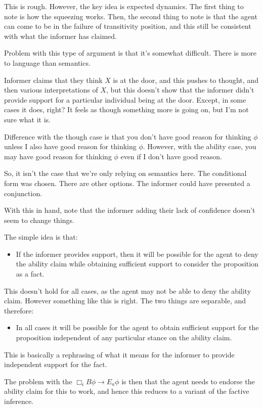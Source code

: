 \documentclass[10pt]{article}
\newcommand{\hozlinedash}[0]{%
  \noindent\hdashrule[0.5ex][c]{\textwidth}{.1pt}{2.5pt}
}
\begin{document}
\begin{note}
This is rough.
However, the key idea is expected dynamics.
The first thing to note is how the squeezing works.
Then, the second thing to note is that the agent can come to be in the failure of transitivity position, and this still be consistent with what the informer has claimed.

Problem with this type of argument is that it's somewhat difficult.
There is more to language than semantics.

Informer claims that they think \(X\) is at the door, and this pushes to thought, and then various interpretations of \(X\), but this doesn't show that the informer didn't provide support for a particular individual being at the door.
Except, in some cases it does, right?
It feels as though something more is going on, but I'm not sure what it is.

Difference with the though case is that you don't have good reason for thinking \(\phi\) unless I also have good reason for thinking \(\phi\).
However, with the ability case, you may have good reason for thinking \(\phi\) even if I don't have good reason.

So, it isn't the case that we're only relying on semantics here.
The conditional form was chosen.
There are other options.
The informer could have presented a conjunction.

With this in hand, note that the informer adding their lack of confidence doesn't seem to change things.
\end{note}





\hozlinedash

\begin{note}
  The simple idea is that:
  \begin{itemize}
  \item If the informer provides support, then it will be possible for the agent to deny the ability claim while obtaining sufficient support to consider the proposition as a fact.
  \end{itemize}
  This doesn't hold for all cases, as the agent may not be able to deny the ability claim.
  However something like this is right.
  The two things are separable, and therefore:
  \begin{itemize}
  \item In all cases it will be possible for the agent to obtain sufficient support for the proposition independent of any particular stance on the ability claim.
  \end{itemize}
  This is basically a rephrasing of what it means for the informer to provide independent support for the fact.

  The problem with the \(\Box_{i} B \phi \rightarrow E_{a}\phi\) is then that the agent needs to endorse the ability claim for this to work, and hence this reduces to a variant of the factive inference.
\end{note}
\end{document}
